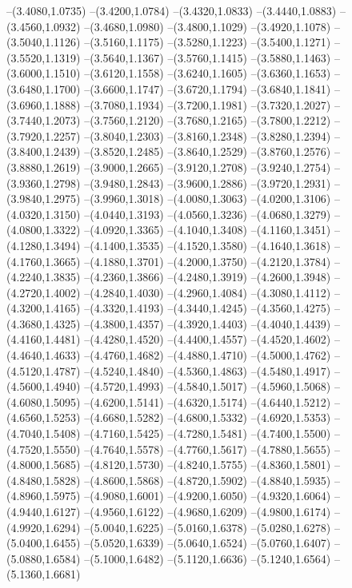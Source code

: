 {\begin{scope}
--(3.4080,1.0735)
--(3.4200,1.0784)
--(3.4320,1.0833)
--(3.4440,1.0883)
--(3.4560,1.0932)
--(3.4680,1.0980)
--(3.4800,1.1029)
--(3.4920,1.1078)
--(3.5040,1.1126)
--(3.5160,1.1175)
--(3.5280,1.1223)
--(3.5400,1.1271)
--(3.5520,1.1319)
--(3.5640,1.1367)
--(3.5760,1.1415)
--(3.5880,1.1463)
--(3.6000,1.1510)
--(3.6120,1.1558)
--(3.6240,1.1605)
--(3.6360,1.1653)
--(3.6480,1.1700)
--(3.6600,1.1747)
--(3.6720,1.1794)
--(3.6840,1.1841)
--(3.6960,1.1888)
--(3.7080,1.1934)
--(3.7200,1.1981)
--(3.7320,1.2027)
--(3.7440,1.2073)
--(3.7560,1.2120)
--(3.7680,1.2165)
--(3.7800,1.2212)
--(3.7920,1.2257)
--(3.8040,1.2303)
--(3.8160,1.2348)
--(3.8280,1.2394)
--(3.8400,1.2439)
--(3.8520,1.2485)
--(3.8640,1.2529)
--(3.8760,1.2576)
--(3.8880,1.2619)
--(3.9000,1.2665)
--(3.9120,1.2708)
--(3.9240,1.2754)
--(3.9360,1.2798)
--(3.9480,1.2843)
--(3.9600,1.2886)
--(3.9720,1.2931)
--(3.9840,1.2975)
--(3.9960,1.3018)
--(4.0080,1.3063)
--(4.0200,1.3106)
--(4.0320,1.3150)
--(4.0440,1.3193)
--(4.0560,1.3236)
--(4.0680,1.3279)
--(4.0800,1.3322)
--(4.0920,1.3365)
--(4.1040,1.3408)
--(4.1160,1.3451)
--(4.1280,1.3494)
--(4.1400,1.3535)
--(4.1520,1.3580)
--(4.1640,1.3618)
--(4.1760,1.3665)
--(4.1880,1.3701)
--(4.2000,1.3750)
--(4.2120,1.3784)
--(4.2240,1.3835)
--(4.2360,1.3866)
--(4.2480,1.3919)
--(4.2600,1.3948)
--(4.2720,1.4002)
--(4.2840,1.4030)
--(4.2960,1.4084)
--(4.3080,1.4112)
--(4.3200,1.4165)
--(4.3320,1.4193)
--(4.3440,1.4245)
--(4.3560,1.4275)
--(4.3680,1.4325)
--(4.3800,1.4357)
--(4.3920,1.4403)
--(4.4040,1.4439)
--(4.4160,1.4481)
--(4.4280,1.4520)
--(4.4400,1.4557)
--(4.4520,1.4602)
--(4.4640,1.4633)
--(4.4760,1.4682)
--(4.4880,1.4710)
--(4.5000,1.4762)
--(4.5120,1.4787)
--(4.5240,1.4840)
--(4.5360,1.4863)
--(4.5480,1.4917)
--(4.5600,1.4940)
--(4.5720,1.4993)
--(4.5840,1.5017)
--(4.5960,1.5068)
--(4.6080,1.5095)
--(4.6200,1.5141)
--(4.6320,1.5174)
--(4.6440,1.5212)
--(4.6560,1.5253)
--(4.6680,1.5282)
--(4.6800,1.5332)
--(4.6920,1.5353)
--(4.7040,1.5408)
--(4.7160,1.5425)
--(4.7280,1.5481)
--(4.7400,1.5500)
--(4.7520,1.5550)
--(4.7640,1.5578)
--(4.7760,1.5617)
--(4.7880,1.5655)
--(4.8000,1.5685)
--(4.8120,1.5730)
--(4.8240,1.5755)
--(4.8360,1.5801)
--(4.8480,1.5828)
--(4.8600,1.5868)
--(4.8720,1.5902)
--(4.8840,1.5935)
--(4.8960,1.5975)
--(4.9080,1.6001)
--(4.9200,1.6050)
--(4.9320,1.6064)
--(4.9440,1.6127)
--(4.9560,1.6122)
--(4.9680,1.6209)
--(4.9800,1.6174)
--(4.9920,1.6294)
--(5.0040,1.6225)
--(5.0160,1.6378)
--(5.0280,1.6278)
--(5.0400,1.6455)
--(5.0520,1.6339)
--(5.0640,1.6524)
--(5.0760,1.6407)
--(5.0880,1.6584)
--(5.1000,1.6482)
--(5.1120,1.6636)
--(5.1240,1.6564)
--(5.1360,1.6681)

\end{scope}}

